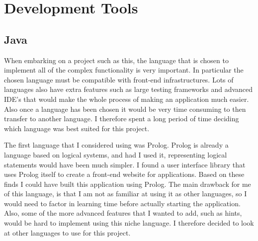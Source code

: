 \pagebreak

\section{Development Tools \label{devTools}}

\subsection{Java}

When embarking on a project such as this, the language that is chosen to implement all of the complex functionality is very important. In particular the chosen language must be compatible with front-end infrastructures. Lots of languages also have extra features such as large testing frameworks and advanced IDE's that would make the whole process of making an application much easier. Also once a language has been chosen it would be very time consuming to then transfer to another language. I therefore spent a long period of time deciding which language was best suited for this project.

The first language that I considered using was Prolog. Prolog is already a language based on logical systems, and had I used it, representing logical statements would have been much simpler. I found a user interface library that uses Prolog itself to create a front-end website for applications. Based on these finds I could have built this application using Prolog. The main drawback for me of this language, is that I am not as familiar at using it as other languages, so I would need to factor in learning time before actually starting the application. Also, some of the more advanced features that I wanted to add, such as hints, would be hard to implement using this niche language. I therefore decided to look at other languages to use for this project. 

